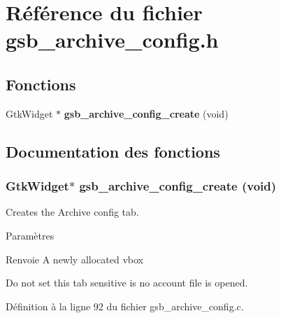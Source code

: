 \section{Référence du fichier gsb\_\-archive\_\-config.h}
\label{gsb__archive__config_8h}
\subsection*{Fonctions}
\begin{DoxyCompactItemize}
\item 
GtkWidget $\ast$ {\bf gsb\_\-archive\_\-config\_\-create} (void)
\end{DoxyCompactItemize}


\subsection{Documentation des fonctions}
\subsubsection[{gsb\_\-archive\_\-config\_\-create}]{\setlength{\rightskip}{0pt plus 5cm}GtkWidget$\ast$ gsb\_\-archive\_\-config\_\-create (void)}\label{gsb__archive__config_8h_a58f2c999f923a1d2ed35bd88b206b95d}
Creates the Archive config tab.


\begin{DoxyParams}{Paramètres}
\item[{\em }]\end{DoxyParams}
\begin{DoxyReturn}{Renvoie}
A newly allocated vbox 
\end{DoxyReturn}


Do not set this tab sensitive is no account file is opened. 



Définition à la ligne 92 du fichier gsb\_\-archive\_\-config.c.


